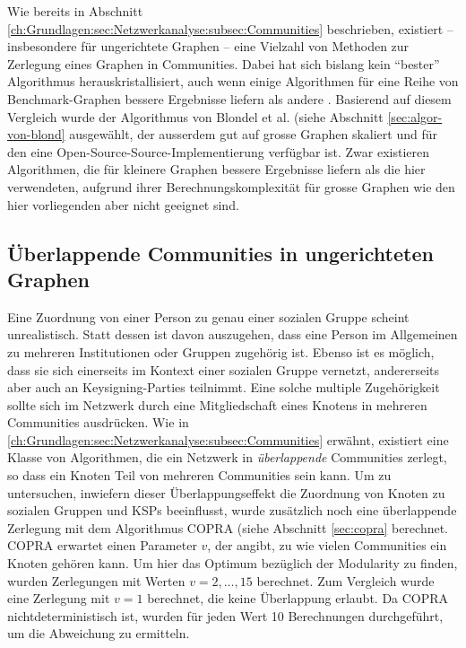 Wie bereits in Abschnitt
\ref{ch:Grundlagen:sec:Netzwerkanalyse:subsec:Communities}
beschrieben, existiert -- insbesondere f\"ur ungerichtete Graphen --
eine Vielzahl von Methoden zur Zerlegung eines Graphen in
Communities. Dabei hat sich bislang kein ``bester'' Algorithmus
herauskristallisiert, auch wenn einige Algorithmen f\"ur eine Reihe
von Benchmark-Graphen bessere Ergebnisse liefern als andere
\cite{Lancichinetti2009}. Basierend auf diesem Vergleich wurde der
Algorithmus von Blondel et al. (siehe Abschnitt
\ref{sec:algor-von-blond} ausgew\"ahlt, der ausserdem gut auf grosse
Graphen skaliert und f\"ur den eine Open-Source-Source-Implementierung
verf\"ugbar ist.  Zwar existieren Algorithmen, die f\"ur kleinere
Graphen bessere Ergebnisse liefern als die hier verwendeten, aufgrund
ihrer Berechnungskomplexit\"at f\"ur grosse Graphen wie den hier
vorliegenden aber nicht geeignet sind.

\subsection{\"Uberlappende Communities in ungerichteten Graphen}
\label{sec:uberl-comm-unger}

Eine Zuordnung von einer Person zu genau einer sozialen Gruppe scheint
unrealistisch. Statt dessen ist davon auszugehen, dass eine Person im
Allgemeinen zu mehreren Institutionen oder Gruppen zugeh\"orig
ist. Ebenso ist es m\"oglich, dass sie sich einerseits im Kontext
einer sozialen Gruppe vernetzt, andererseits aber auch an
Keysigning-Parties teilnimmt. Eine solche multiple Zugeh\"origkeit
sollte sich im Netzwerk durch eine Mitgliedschaft eines Knotens in
mehreren Communities ausdr\"ucken. Wie in
\ref{ch:Grundlagen:sec:Netzwerkanalyse:subsec:Communities} erw\"ahnt,
existiert eine Klasse von Algorithmen, die ein Netzwerk in
\emph{\"uberlappende} Communities zerlegt, so dass ein Knoten Teil von
mehreren Communities sein kann. Um zu untersuchen, inwiefern dieser
\"Uberlappungseffekt die Zuordnung von Knoten zu sozialen Gruppen und
KSPs beeinflusst, wurde zus\"atzlich noch eine \"uberlappende
Zerlegung mit dem Algorithmus COPRA (siehe Abschnitt \ref{sec:copra}
berechnet. COPRA erwartet einen Parameter $v$, der angibt, zu wie
vielen Communities ein Knoten geh\"oren kann. Um hier das Optimum
bez\"uglich der Modularity zu finden, wurden Zerlegungen mit Werten
$v=2, \dots, 15$ berechnet. Zum Vergleich wurde eine Zerlegung mit
$v=1$ berechnet, die keine \"Uberlappung erlaubt. Da COPRA
nichtdeterministisch ist, wurden f\"ur jeden Wert 10 Berechnungen
durchgef\"uhrt, um die Abweichung zu ermitteln.



